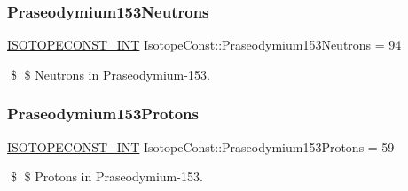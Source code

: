 \subsubsection{\texorpdfstring{Praseodymium153\+Neutrons}{Praseodymium153Neutrons}}
{\footnotesize\ttfamily \mbox{\hyperlink{group___isotope_const-_macros_ga5f18360b3e99483a35c32d789e62621c}{I\+S\+O\+T\+O\+P\+E\+C\+O\+N\+S\+T\+\_\+\+I\+NT}} Isotope\+Const\+::\+Praseodymium153\+Neutrons = 94}

\$ \$ Neutrons in Praseodymium-\/153. \mbox{\label{group___isotope_const-_praseodymium-_pr153_ga3120173bf69451ed96fcbfaa276170b5}} 
\subsubsection{\texorpdfstring{Praseodymium153\+Protons}{Praseodymium153Protons}}
{\footnotesize\ttfamily \mbox{\hyperlink{group___isotope_const-_macros_ga5f18360b3e99483a35c32d789e62621c}{I\+S\+O\+T\+O\+P\+E\+C\+O\+N\+S\+T\+\_\+\+I\+NT}} Isotope\+Const\+::\+Praseodymium153\+Protons = 59}

\$ \$ Protons in Praseodymium-\/153. 